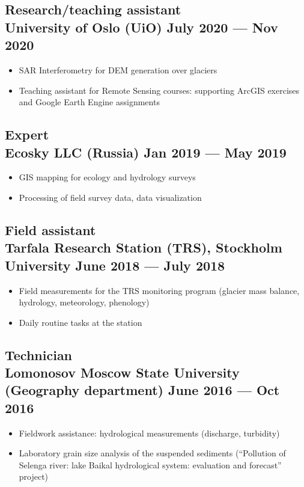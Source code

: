 \documentclass[a4,10pt]{article}
\newenvironment{zitemize}{
\begin{itemize}\itemsep2pt \parskip0pt \parsep1pt}
{\end{itemize}\vspace{-0.5cm}}
\begin{document}
    
\subsection*{Research/teaching assistant \\University of Oslo (UiO) \hfill July 2020 --- Nov 2020} 
    \begin{zitemize}
        \item SAR Interferometry for DEM generation over glaciers 
        \item Teaching assistant for Remote Sensing courses: supporting ArcGIS exercises and Google Earth Engine assignments
    \end{zitemize}  
    
\subsection*{Expert \\Ecosky LLC (Russia) \hfill Jan 2019 --- May 2019} 
    \begin{zitemize}
        \item GIS mapping for ecology and hydrology surveys
        \item Processing of field survey data, data visualization
    \end{zitemize}  
    
\subsection*{Field assistant \\Tarfala Research Station (TRS), Stockholm University \hfill June 2018 --- July 2018} 
    \begin{zitemize}
        \item Field measurements for the TRS monitoring program (glacier mass balance, hydrology, meteorology, phenology)
        \item Daily routine tasks at the station
    \end{zitemize}  

\subsection*{Technician \\Lomonosov Moscow State University (Geography department) \hfill June 2016 --- Oct 2016} 
    \begin{zitemize}
        \item Fieldwork assistance: hydrological measurements (discharge, turbidity)
        \item Laboratory grain size analysis of the suspended sediments (``Pollution of Selenga river: lake Baikal hydrological system: evaluation and forecast'' project)
    \end{zitemize}
\end{document}
